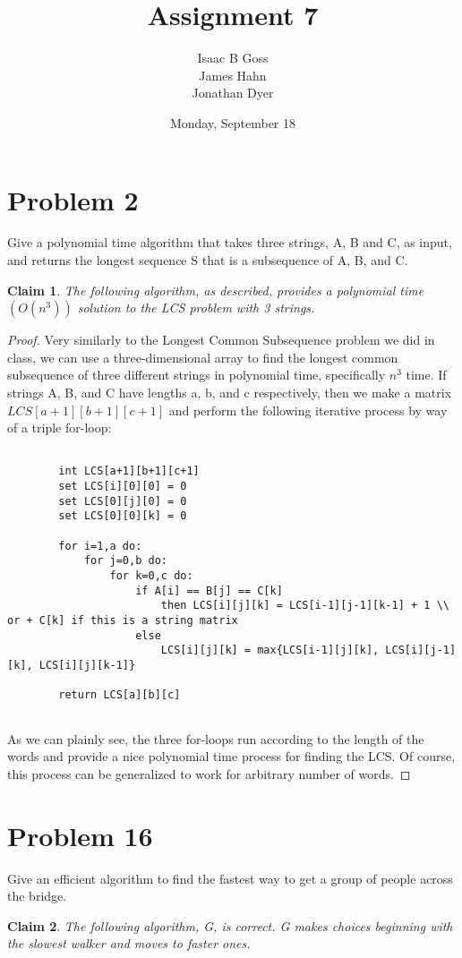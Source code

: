 \documentclass{article}
\author{Isaac B Goss\\ James Hahn\\ Jonathan Dyer}
\title{Assignment 7}
\date{Monday, September 18}
\newtheorem{thm}{Claim}
\providecommand{\prob}[1]{\section*{Problem #1}}
\begin{document}
\maketitle

\prob{2}
Give a polynomial time algorithm that takes three strings, A, B and C, as input, and returns the longest sequence S that is a subsequence of A, B, and C.

\begin{thm}
The following algorithm, as described, provides a polynomial time $(O(n^3))$ solution to the LCS problem with 3 strings.
\end{thm}

\begin{proof}
    Very similarly to the Longest Common Subsequence problem we did in class, we can use a three-dimensional array to find the longest common subsequence of three different strings in polynomial time, specifically $n^3$ time. If strings A, B, and C have lengths a, b, and c respectively, then we make a matrix $LCS[a+1][b+1][c+1]$ and perform the following iterative process by way of a triple for-loop:
    
    \begin{lstlisting}

        int LCS[a+1][b+1][c+1]
        set LCS[i][0][0] = 0
        set LCS[0][j][0] = 0
        set LCS[0][0][k] = 0
        
        for i=1,a do:
            for j=0,b do:
                for k=0,c do:
                    if A[i] == B[j] == C[k]
                        then LCS[i][j][k] = LCS[i-1][j-1][k-1] + 1 \\ or + C[k] if this is a string matrix
                    else
                        LCS[i][j][k] = max{LCS[i-1][j][k], LCS[i][j-1][k], LCS[i][j][k-1]}
                    
        return LCS[a][b][c]
        
    \end{lstlisting}
    
    As we can plainly see, the three for-loops run according to the length of the words and provide a nice polynomial time process for finding the LCS. Of course, this process can be generalized to work for arbitrary number of words.

\end{proof}

\prob{16}
Give an efficient algorithm to find the fastest way to get a group of people across the bridge.

\begin{thm}
	The following algorithm, G, is correct.  G makes choices beginning with the slowest walker and moves to faster ones.
\end{thm}
\end{document}
